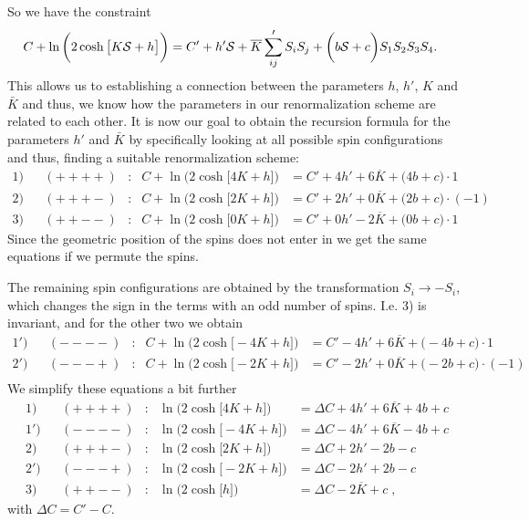 So we have the constraint
%
\begin{align}\label{eq:constr}
C + \ln\bigg(2\cosh\big[K{\cal S} +h  \big]  \bigg)&=
C' + h' {\cal S} + \overline K \sum'_{ij} S_{i}S_{j}  +
\bigg(b{\cal S} + c\bigg) S_{1}S_{2}S_{3}S_{4} .
\end{align}
%
This allows us to establishing a connection between the parameters $h$, $h'$, $K$ and $\bar{K}$ and thus, we know how the parameters in our renormalization scheme are related to each other. It is now our goal to obtain the recursion formula for the parameters $h'$ and $\bar{K}$ by specifically looking at all possible spin configurations and thus, finding a suitable renormalization scheme:
%
\begin{align*}
1)&&(++++)&:&C + \ln\bigg(2\cosh\big[4 K+h  \big]  \bigg) &=
C' + 4 h'  + 6 \overline K   + \big(4b+c\big)\cdot 1 \\
2)&&(+++-)&:&C + \ln\bigg(2\cosh\big[2 K+h  \big]  \bigg) &=
C' + 2 h'  + 0 \overline K   + \big(2b+c\big)\cdot (-1) \\
3)&&(++--)&:&C + \ln\bigg(2\cosh\big[0K+h  \big]  \bigg) &=
C' + 0 h'  - 2 \overline K   + \big(0b+c\big)\cdot 1 \;
\end{align*}
%
Since the geometric position of the spins does not enter in  we get the same equations if we permute the spins.

%
The remaining spin configurations
are obtained by the transformation $S_{i}\to - S_{i}$, which changes the sign in the terms with an odd number of spins. I.e. 3) is invariant, and for the other two we obtain
\begin{align*}
1')&&(----)&:&C + \ln\bigg(2\cosh\big[-4 K+h  \big]  \bigg) &=
C' - 4 h'  + 6 \overline K   + \big(-4b+c\big)\cdot 1 \\
2')&&(---+)&:&C + \ln\bigg(2\cosh\big[-2 K+h  \big]  \bigg) &=
C' - 2 h'  + 0 \overline K   + \big(-2b+c\big)\cdot (-1) \\
\end{align*}
%
We simplify these equations a bit further
\begin{align*}
1)&&(++++)&:& \ln\bigg(2\cosh\big[4 K+h  \big]  \bigg) &=
\Delta C + 4 h'  + 6 \overline K   + 4b+c \\
1')&&(----)&:& \ln\bigg(2\cosh\big[-4 K+h  \big]  \bigg) &=
\Delta C  - 4 h'  + 6 \overline K   -4b+c \\
2)&&(+++-)&:&\ln\bigg(2\cosh\big[2 K+h  \big]  \bigg) &=
\Delta C + 2 h'   - 2b-c \\
2')&&(---+)&:&\ln\bigg(2\cosh\big[-2 K+h  \big]  \bigg) &=
\Delta C - 2 h'     + 2b-c\\
3)&&(++--)&:& \ln\bigg(2\cosh\big[h  \big]  \bigg) &=
\Delta C - 2 \overline K   + c \;,
\end{align*}
%
with $\Delta C = C'-C$. 

